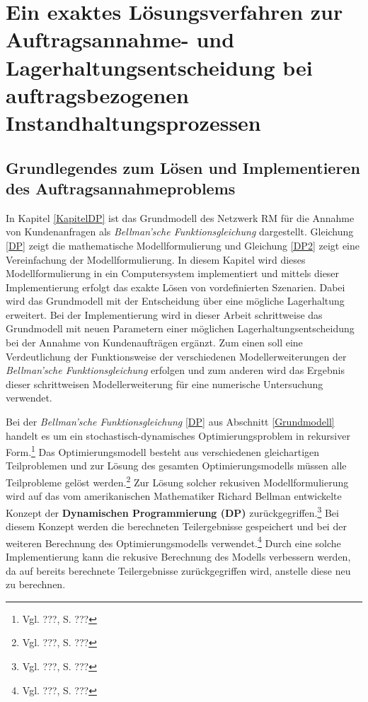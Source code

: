 \chapter{Ein exaktes Lösungsverfahren zur Auftragsannahme- und Lagerhaltungsentscheidung bei auftragsbezogenen Instandhaltungsprozessen}
\setcounter{footnote}{7}

\section{Grundlegendes zum Lösen und Implementieren des Auftragsannahmeproblems}

In Kapitel \ref{KapitelDP} ist das Grundmodell des Netzwerk RM für die Annahme von Kundenanfragen als \textit{Bellman'sche Funktionsgleichung} dargestellt. Gleichung \eqref{DP} zeigt die mathematische Modellformulierung und Gleichung \eqref{DP2} zeigt eine Vereinfachung der Modellformulierung. In diesem Kapitel wird dieses Modellformulierung in ein Computersystem implementiert und mittels dieser Implementierung erfolgt das exakte Lösen von vordefinierten Szenarien. Dabei wird das Grundmodell mit der Entscheidung über eine mögliche Lagerhaltung erweitert. Bei der Implementierung wird in dieser Arbeit schrittweise das Grundmodell mit neuen Parametern einer möglichen Lagerhaltungsentscheidung bei der Annahme von Kundenaufträgen ergänzt. Zum einen soll eine Verdeutlichung der Funktionsweise der verschiedenen Modellerweiterungen der \textit{Bellman'sche Funktionsgleichung} erfolgen und zum anderen wird das Ergebnis dieser schrittweisen Modellerweiterung für eine numerische Untersuchung verwendet.

Bei der \textit{Bellman'sche Funktionsgleichung} \eqref{DP} aus Abschnitt \ref{Grundmodell} handelt es um ein stochastisch-dynamisches Optimierungsproblem in rekursiver Form.\footnote{Vgl. ???, S. ???} Das Optimierungsmodell besteht aus verschiedenen gleichartigen Teilproblemen und zur Lösung des gesamten Optimierungsmodells müssen alle Teilprobleme gelöst werden.\footnote{Vgl. ???, S. ???} Zur Lösung solcher rekusiven Modellformulierung wird auf das vom amerikanischen Mathematiker Richard Bellman entwickelte Konzept der \textbf{Dynamischen Programmierung (DP)} zurückgegriffen.\footnote{Vgl. ???, S. ???} Bei diesem Konzept werden die berechneten Teilergebnisse gespeichert und bei der weiteren Berechnung des Optimierungsmodells verwendet.\footnote{Vgl. ???, S. ???} Durch eine solche Implementierung kann die rekusive Berechnung des Modells verbessern werden, da auf bereits berechnete Teilergebnisse zurückgegriffen wird, anstelle diese neu zu berechnen.

